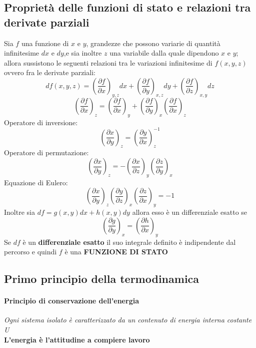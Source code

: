 \documentclass{article}
\begin{document}
\subsection{Proprietà delle funzioni di stato e relazioni tra derivate parziali}
Sia $f$ una funzione di $x$ e $y$, grandezze che possono variarie di quantità infinitesime $dx$ e $dy$,e sia inoltre $z$ una variabile dalla quale dipendono $x$ e $y$; allora sussistono le seguenti relazioni tra le variazioni infinitesime di $f(x,y,z)$ ovvero fra le derivate parziali:
\begin{equation*}
    df(x,y,z)=(\frac{\partial f}{\partial x})_{y,z}dx+(\frac{\partial f}{\partial y})_{x,z}dy+(\frac{\partial f}{\partial z})_{x,y}dz
\end{equation*}
\begin{equation*}
    (\frac{\partial f}{\partial x})_z=(\frac{\partial f}{\partial x})_{y}+(\frac{\partial f}{\partial y})_x(\frac{\partial f}{\partial x})_z
\end{equation*}
Operatore di inversione:
\begin{equation*}
    (\frac{\partial x}{\partial y})_z=(\frac{\partial y}{\partial x})_z^{-1}
\end{equation*}
Operatore di permutazione:
\begin{equation*}
    (\frac{\partial x}{\partial y})_z=-(\frac{\partial x}{\partial z})_y(\frac{\partial z}{\partial y})_x
\end{equation*}
Equazione di Eulero:
\begin{equation*}
    (\frac{\partial x}{\partial y})_z(\frac{\partial y}{\partial z})_x(\frac{\partial z}{\partial x})_y=-1
\end{equation*}
Inoltre sia $df=g(x,y)dx+h(x,y)dy$ allora esso è un differenziale esatto se 
\begin{equation*}
    (\frac{\partial g}{\partial y})_x=(\frac{\partial h}{\partial x})_y
\end{equation*}
Se $df$ è un \textbf{differenziale esatto} il suo integrale definito è indipendente dal percorso e quindi $f$ è una \textbf{FUNZIONE DI STATO}

\subsection{Primo principio della termodinamica}
\paragraph{Principio di conservazione dell'energia}
\begin{center}
    \textit{Ogni sistema isolato è caratterizzato da un contenuto di energia interna costante U} \\ \textbf{L'energia è l'attitudine a compiere lavoro}
\end{center}
\end{document}
